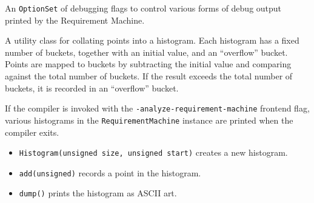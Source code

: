 \documentclass[../generics]{subfiles}
\begin{document}
An \texttt{OptionSet} of debugging flags to control various forms of debug output printed by the Requirement Machine.

%
A utility class for collating points into a histogram. Each histogram has a fixed number of buckets, together with an initial value, and an ``overflow'' bucket. Points are mapped to buckets by subtracting the initial value and comparing against the total number of buckets. If the result exceeds the total number of buckets, it is recorded in an ``overflow'' bucket.

If the compiler is invoked with the \texttt{-analyze-requirement-machine} frontend flag, various histograms in the \texttt{RequirementMachine} instance are printed when the compiler exits.
\begin{itemize}
\item \texttt{Histogram(unsigned size, unsigned start)} creates a new histogram.
\item \texttt{add(unsigned)} records a point in the histogram.
\item \texttt{dump()} prints the histogram as ASCII art.
\end{itemize}
\end{document}

